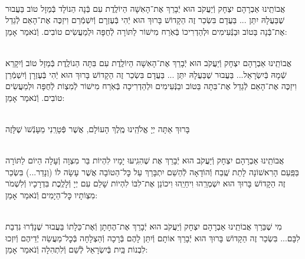 \documentclass[twoside, openany, parskip=half, 11pt]{book}
\begin{document}
\begin{sometimes}



\\
אֲבוֹתֵֽינוּ אַבְרָהָם יִצְחָק וְֿיַעֲקֹב הוּא יְֿבָרֵךְ אֶת־הָאִשָׁה הַיוֹלֶֽדֶת
עִם בְּֿנָה הַנוֹלָד בְּֿמַזָל טוֹב בַּעֲבוּר שֶׁבַּעֲלָהּ יִתֵּן ... בַּעֲדָם בִּשְׂכַר זֶה הַקָדוֹשׁ בָּרוּךְ הוּא יְֿהִי בְּֿעֶזְרָם וְֿיִשְׁמְֿרֵם וִיזַכֶּה אֶת־הָאֵם לְֿגַדֵל אֶת־בְּֿנָה בַּטוֹב וּבַנְּֿעִימִים וּלְהַדְרִיכוֹ בְּֿאֹֽרַח מִישׁוֹר לַתּוֹרָה לְֿחֻפָּה וּלְמַעֲשִׂים טוֹבִים. וְֿנֹאמַר אָמֵן:



\\
אֲבוֹתֵֽינוּ אַבְרָהָם יִצְחָק וְֿיַעֲקֹב הוּא יְֿבָרֵךְ אֶת־הָאִשָׁה הַיוֹלֶֽדֶת
עִם בִּתָּה הַנוֹלֶֽדֶת בְּֿמַזָל טוֹב וְֿיִקָרֵא שְֿׁמָהּ בְּֿיִשְׂרָאֵל... בַּעֲבוּר שֶׁבַּעֲלָהּ יִתֵּן ... בַּעֲדָם בִּשְׂכַר זֶה הַקָדוֹשׁ בָּרוּךְ הוּא יְֿהִי בְּֿעֶזְרָן וְֿיִשְׁמְֿרֵן וִיזַכֶּה אֶת־הָאֵם לְֿגַדֵל אֶת־בִּתָּה בַּטוֹב ובַנְּֿעִימִים וּלְהַדְרִיכָה בְּֿאֹֽרַח מִישׁוֹר לְֿמִצְוֹת לְֿחֻפָּה וּלְמַעֲשִׂים טוֹבִים. וְֿנֹאמַר אָמֵן:

\\
בָּרוּךְ אַתָּה יְיָ אֱלֹהֵֽינוּ מֶֽלֶךְ הָעוֹלָם, אֲשֶׁר פְּֿטָרַֽנִי מֵעָנְֿשׁוׂ שֶׁלָּזֶה

\\
אֲבוֹתֵֽינוּ אַבְרָהָם יִצְחָק וְֿיַעֲקֹב הוּא יְֿבָרֵךְ אֶת
שֶׁהִגִֽיעוּ יָמָיו לִהְיוֹת בַּר מִצְוָה וְֿעָלָה הַיוֹם לַתּוֹרָה בַּפַּֽעַם הָרִאשׁוֹנָה לָתֵת שֶֽׁבַח וְֿהוֹדָאָה לְֿהַשֵׁם יִתְבָּרַךְ עַל כׇּל־הַטוֹבָה אֲשֶׁר עָשָׂה לוֹ (וְנָדַר...) בִּשְׂכַר זֶה הַקָדוֹשׁ בָּרוּךְ הוּא יִשְׁמְרֵֽהוּ וִיחַיֵֽהוּ וִיכוֹנֵן אֶת־לִבּוֹ לִהְיוֹת שָׁלֵם עִם יְיָ וְֿלָלֶֽכֶת בִּדְרָכָיו וְֿלִשְׁמֹר מִצְוֹתָיו כׇּל־הַיָמִים וְֿנֹאמַר אָמֵן:


\\
מִי שֶׁבֵּרַךְ אֲבוֹתֵֽינוּ אַבְרָהָם יִצְחָק וְֿיַעֲקֹב הוּא יְֿבָרֵךְ אֶת־הֶחָתָן  וְֿאֶת־כַּלָתוֹ בַּעֲבוּר שֶׁנָדְֿרוּ נִדְבַת לִבָּם... בִּשְׂכַר זֶה הַקָדוֹשׁ בָּרוּךְ הוּא יְֿבָרֵךְ אוֹתָם וְֿיִתֵּן לָהֶם בְּֿרָכָה וְֿהַצְלָחָה בְּֿכׇל־מַעֲשֵׂה יְֿדֵיהֶם וְֿיִזְכוּ לִבְנוֹת בַּֽיִת בְּֿיִשְׂרָאֵל לְֿשֵׁם וְֿלִתְהִלָה וְֿנֹאמַר אָמֵן:


\end{sometimes}
\end{document}
